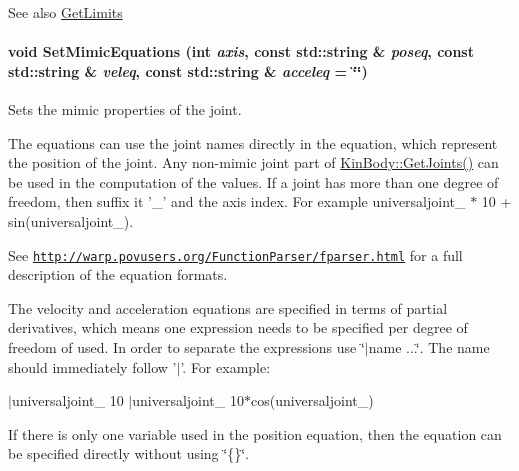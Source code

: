 \label{classOpenRAVE_1_1KinBody_1_1Joint_a90d56cf93256fd2c4087cd3bac140e66}
\begin{DoxySeeAlso}{See also}
\hyperlink{classOpenRAVE_1_1KinBody_1_1Joint_a9cbbcd5d35fb3830b35c33f244570566}{GetLimits} 
\end{DoxySeeAlso}
\hypertarget{classOpenRAVE_1_1KinBody_1_1Joint_a0e31c5be31c4145afa786e0c0d6a46ae}{
\paragraph[{SetMimicEquations}]{\setlength{\rightskip}{0pt plus 5cm}void SetMimicEquations (int {\em axis}, \/  const std::string \& {\em poseq}, \/  const std::string \& {\em veleq}, \/  const std::string \& {\em acceleq} = {\ttfamily \char`\"{}\char`\"{}})}\hfill}
\label{classOpenRAVE_1_1KinBody_1_1Joint_a0e31c5be31c4145afa786e0c0d6a46ae}


Sets the mimic properties of the joint. 

The equations can use the joint names directly in the equation, which represent the position of the joint. Any non-\/mimic joint part of \hyperlink{classOpenRAVE_1_1KinBody_a01fcab06f416b2ac3bac1385e09ff9bf}{KinBody::GetJoints()} can be used in the computation of the values. If a joint has more than one degree of freedom, then suffix it '\_\-' and the axis index. For example universaljoint\_ $\ast$ 10 + sin(universaljoint\_).

See \href{http://warp.povusers.org/FunctionParser/fparser.html}{\tt http://warp.povusers.org/FunctionParser/fparser.html} for a full description of the equation formats.

The velocity and acceleration equations are specified in terms of partial derivatives, which means one expression needs to be specified per degree of freedom of used. In order to separate the expressions use \char`\"{}$|$name ...\char`\"{}. The name should immediately follow '$|$'. For example:

$|$universaljoint\_ 10 $|$universaljoint\_ 10$\ast$cos(universaljoint\_)

If there is only one variable used in the position equation, then the equation can be specified directly without using \char`\"{}\{\}\char`\"{}.


